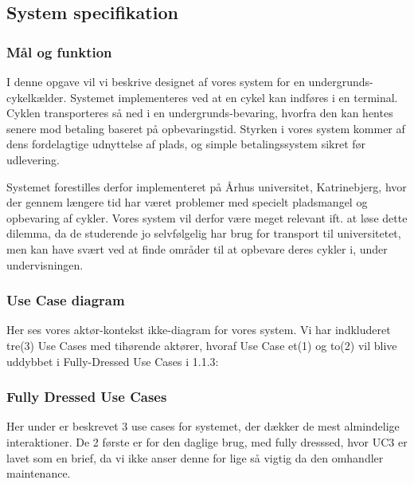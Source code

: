 \documentclass[../main.tex]{subfiles}
\begin{document}
\subsection{System specifikation}
\subsubsection{Mål og funktion}
I denne opgave vil vi beskrive designet af vores system for en undergrunds-cykelkælder. Systemet implementeres ved at en cykel kan indføres i en terminal. Cyklen transporteres så ned i en undergrunds-bevaring, hvorfra den kan hentes senere mod betaling baseret på opbevaringstid. Styrken i vores system kommer af dens fordelagtige udnyttelse af plads, og simple betalingssystem sikret før udlevering.


Systemet forestilles derfor implementeret på Århus universitet, Katrinebjerg, hvor der gennem længere tid har været problemer med specielt pladsmangel og opbevaring af cykler. Vores system vil derfor være meget relevant ift. at løse dette dilemma, da de studerende jo selvfølgelig har brug for transport til universitetet, men kan have svært ved at finde områder til at opbevare deres cykler i, under undervisningen.


\subsubsection{Use Case diagram}
Her ses vores aktør-kontekst ikke-diagram for vores system. Vi har indkluderet tre(3) Use Cases med tihørende aktører, hvoraf Use Case et(1) og to(2) vil blive uddybbet i Fully-Dressed Use Cases i 1.1.3:

\subsubsection{Fully Dressed Use Cases}
Her under er beskrevet 3 use cases for systemet, der dækker de mest almindelige interaktioner. De 2 første er for den daglige brug, med fully dresssed, hvor UC3 er lavet som en brief, da vi ikke anser denne for lige så vigtig da den omhandler maintenance.
\end{document}
